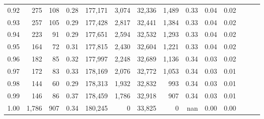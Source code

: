 \begin{tabular}{rrrrrrrrrrrrrr}
0.92 &    275 &  108 &  0.28 &  177,171 &    3,074 &  32,336 &   1,489 &  0.33 &  0.04 &      0.02 \\
0.93 &    257 &  105 &  0.29 &  177,428 &    2,817 &  32,441 &   1,384 &  0.33 &  0.04 &      0.02 \\
0.94 &    223 &   91 &  0.29 &  177,651 &    2,594 &  32,532 &   1,293 &  0.33 &  0.04 &      0.02 \\
0.95 &    164 &   72 &  0.31 &  177,815 &    2,430 &  32,604 &   1,221 &  0.33 &  0.04 &      0.02 \\
0.96 &    182 &   85 &  0.32 &  177,997 &    2,248 &  32,689 &   1,136 &  0.34 &  0.03 &      0.02 \\
0.97 &    172 &   83 &  0.33 &  178,169 &    2,076 &  32,772 &   1,053 &  0.34 &  0.03 &      0.01 \\
0.98 &    144 &   60 &  0.29 &  178,313 &    1,932 &  32,832 &     993 &  0.34 &  0.03 &      0.01 \\
0.99 &    146 &   86 &  0.37 &  178,459 &    1,786 &  32,918 &     907 &  0.34 &  0.03 &      0.01 \\
1.00 &  1,786 &  907 &  0.34 &  180,245 &        0 &  33,825 &       0 &   nan &  0.00 &      0.00 \\
\bottomrule
\end{tabular}
